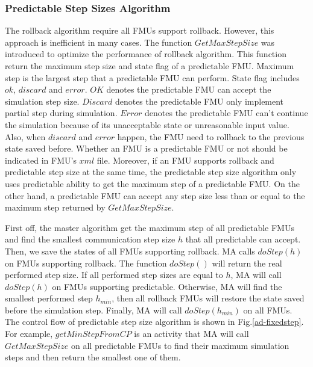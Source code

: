 \subsubsection{Predictable Step Sizes Algorithm}
The rollback algorithm require all FMUs support rollback. However, this approach is inefficient in many cases. The function $GetMaxStepSize$ was introduced to optimize the performance of rollback algorithm. This function return the maximum step size and state flag of a predictable FMU. Maximum step is the largest step that a predictable FMU can perform. State flag includes $ok$, $discard$ and $error$. $OK$ denotes the predictable FMU can accept the simulation step size. $Discard$ denotes the predictable FMU only implement partial step during simulation. $Error$ denotes the predictable FMU can't continue the simulation because of its unacceptable state or unreasonable input value. Also, when $discard$ and $error$ happen, the FMU need to rollback to the previous state saved before. Whether an FMU is a predictable FMU or not should be indicated in FMU's $xml$ file. Moreover, if an FMU supports rollback and predictable step size at the same time, the predictable step size algorithm only uses predictable ability to get the maximum step of a predictable FMU. On the other hand, a predictable FMU can accept any step size less than or equal to the maximum step returned by $GetMaxStepSize$.

First off, the master algorithm get the maximum step of all predictable FMUs and find the smallest communication step size $h$ that all predictable can accept. Then, we save the states of all FMUs supporting rollback. MA calls $doStep(h)$ on FMUs supporting rollback. The function $doStep()$ will return the real performed step size. If all performed step sizes are equal to $h$, MA will call $doStep(h)$ on FMUs supporting predictable. Otherwise, MA will find the smallest performed step $h_{min}$, then all rollback FMUs will restore the state saved before the simulation step. Finally, MA will call $doStep(h_{min})$ on all FMUs. The control flow of predictable step size algorithm is shown in Fig.\ref{ad-fixedstep}. For example, $getMinStepFromCP$ is an activity that MA will call $GetMaxStepSize$ on all predictable FMUs to find their maximum simulation steps and then return the smallest one of them. 

